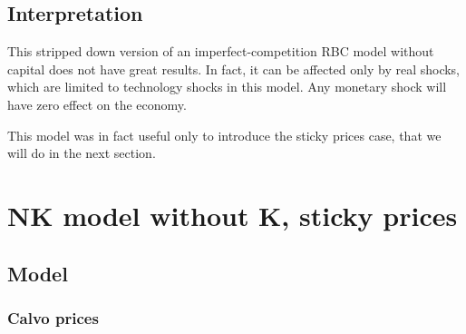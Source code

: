 \documentclass[12pt]{report}
\begin{document}
\subsection{Interpretation}

This stripped down version of an imperfect-competition RBC model without capital does not have great results. In fact, it can be affected only by real shocks, which are limited to technology shocks in this model. Any monetary shock will have zero effect on the economy.

This model was in fact useful only to introduce the sticky prices case, that we will do in the next section.

\section{NK model without K, sticky prices}

\subsection{Model}

\subsubsection{Calvo prices}
\end{document}
